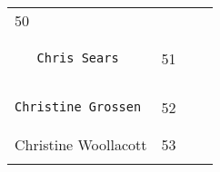 \documentclass[]{article}
\begin{document}
\begin{longtable}[c]{@{}llll@{}}
\begin{minipage}[t]{0.10\columnwidth}
50
\end{minipage} & \begin{minipage}[t]{0.13\columnwidth}\raggedright
\end{minipage} & \begin{minipage}[t]{0.15\columnwidth}\raggedright
\end{minipage}
\\\noalign{\medskip}
\begin{minipage}[t]{0.39\columnwidth}\raggedright
\begin{verbatim}
   Chris Sears
\end{verbatim}
\end{minipage} & \begin{minipage}[t]{0.10\columnwidth}\raggedright
51
\end{minipage} & \begin{minipage}[t]{0.13\columnwidth}\raggedright
\end{minipage} & \begin{minipage}[t]{0.15\columnwidth}\raggedright
\end{minipage}
\\\noalign{\medskip}
\begin{minipage}[t]{0.39\columnwidth}\raggedright
\begin{verbatim}
Christine Grossen
\end{verbatim}
\end{minipage} & \begin{minipage}[t]{0.10\columnwidth}\raggedright
52
\end{minipage} & \begin{minipage}[t]{0.13\columnwidth}\raggedright
\end{minipage} & \begin{minipage}[t]{0.15\columnwidth}\raggedright
\end{minipage}
\\\noalign{\medskip}
\begin{minipage}[t]{0.39\columnwidth}\raggedright
Christine Woollacott
\end{minipage} & \begin{minipage}[t]{0.10\columnwidth}\raggedright
53
\end{minipage} & \begin{minipage}[t]{0.13\columnwidth}\raggedright
\end{minipage} & \begin{minipage}[t]{0.15\columnwidth}\raggedright
\end{minipage}
\\\noalign{\medskip}

\end{longtable}
\end{document}
